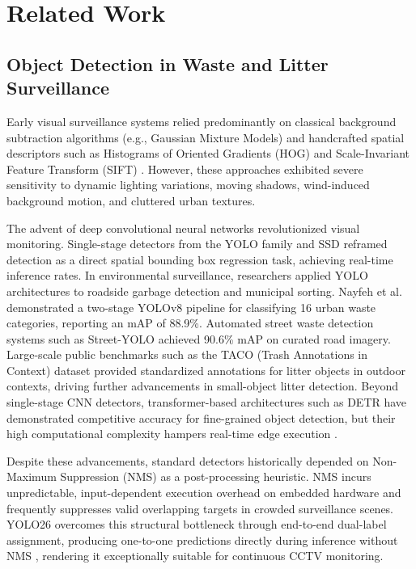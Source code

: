 \documentclass[conference]{IEEEtran}
\begin{document}
\section{Related Work}
\label{sec:related}

\subsection{Object Detection in Waste and Litter Surveillance}

Early visual surveillance systems relied predominantly on classical background subtraction algorithms (e.g., Gaussian Mixture Models) and handcrafted spatial descriptors such as Histograms of Oriented Gradients (HOG) and Scale-Invariant Feature Transform (SIFT) \cite{b14}. However, these approaches exhibited severe sensitivity to dynamic lighting variations, moving shadows, wind-induced background motion, and cluttered urban textures.

The advent of deep convolutional neural networks revolutionized visual monitoring. Single-stage detectors from the YOLO family \cite{b4, b5} and SSD \cite{b6} reframed detection as a direct spatial bounding box regression task, achieving real-time inference rates. In environmental surveillance, researchers applied YOLO architectures to roadside garbage detection and municipal sorting. Nayfeh et al.\ \cite{b7} demonstrated a two-stage YOLOv8 pipeline for classifying 16 urban waste categories, reporting an mAP of 88.9\%. Automated street waste detection systems such as Street-YOLO \cite{b8} achieved 90.6\% mAP on curated road imagery. Large-scale public benchmarks such as the TACO (Trash Annotations in Context) dataset \cite{b21} provided standardized annotations for litter objects in outdoor contexts, driving further advancements in small-object litter detection. Beyond single-stage CNN detectors, transformer-based architectures such as DETR have demonstrated competitive accuracy for fine-grained object detection, but their high computational complexity hampers real-time edge execution \cite{b15}.

Despite these advancements, standard detectors historically depended on Non-Maximum Suppression (NMS) as a post-processing heuristic. NMS incurs unpredictable, input-dependent execution overhead on embedded hardware and frequently suppresses valid overlapping targets in crowded surveillance scenes. YOLO26 overcomes this structural bottleneck through end-to-end dual-label assignment, producing one-to-one predictions directly during inference without NMS \cite{b3}, rendering it exceptionally suitable for continuous CCTV monitoring.
\end{document}
